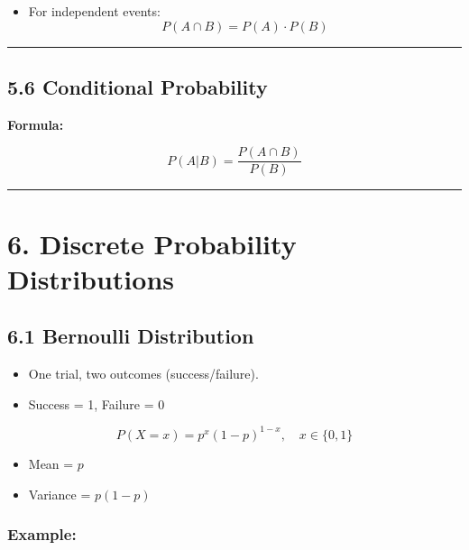 \documentclass[
  letterpaper,
  DIV=11,
  numbers=noendperiod]{scrreprt}
\providecommand{\tightlist}{%
  \setlength{\itemsep}{0pt}\setlength{\parskip}{0pt}}
\begin{document}
\begin{itemize}
\tightlist
\item
  For independent events:\\
  \[
  P(A \cap B) = P(A) \cdot P(B)
  \]
\end{itemize}

\begin{center}\rule{0.5\linewidth}{0.5pt}\end{center}

\subsection{5.6 Conditional Probability}\label{conditional-probability}

\textbf{Formula:}

\[
P(A | B) = \frac{P(A \cap B)}{P(B)}
\]

\begin{center}\rule{0.5\linewidth}{0.5pt}\end{center}

\section{6. Discrete Probability
Distributions}\label{discrete-probability-distributions}

\subsection{6.1 Bernoulli Distribution}\label{bernoulli-distribution}

\begin{itemize}
\tightlist
\item
  One trial, two outcomes (success/failure).
\item
  Success = 1, Failure = 0
\end{itemize}

\[
P(X = x) = p^x (1 - p)^{1 - x}, \quad x \in \{0,1\}
\]

\begin{itemize}
\tightlist
\item
  Mean = \(p\)
\item
  Variance = \(p(1 - p)\)
\end{itemize}

\subsubsection{Example:}\label{example-6}
\end{document}
